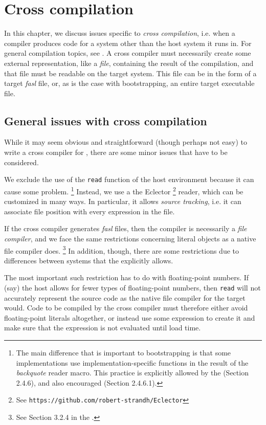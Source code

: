 \chapter{Cross compilation}
\label{chap-cross-compilation}

In this chapter, we discuss issues specific to \emph{cross
  compilation}, i.e. when a compiler produces code for a system other
than the host \commonlisp{} system it runs in.  For general
compilation topics, see .  A cross compiler
must necessarily create some external representation, like a
\emph{file}, containing the result of the compilation, and that file
must be readable on the target system.  This file can be in the form
of a target \emph{fasl} file, or, as is the case with \sysname{}
bootstrapping, an entire target executable file.

\section{General issues with cross compilation}

While it may seem obvious and straightforward (though perhaps not
easy) to write a cross compiler for \commonlisp{}, there are some minor issues
that have to be considered. 

We exclude the use of the \texttt{read} function of the host
environment because it can cause some problem.%
\footnote{The main difference that is important to bootstrapping is
  that some implementations use implementation-specific functions in
  the result of the \emph{backquote} reader macro.  This practice is
  explicitly allowed by the \hs{} (Section 2.4.6), and also encouraged
  (Section 2.4.6.1).}
Instead, we use a the Eclector%
\footnote{See \texttt{https://github.com/robert-strandh/Eclector}}
reader, which can be customized in many ways.  In particular, it
allows \emph{source tracking}, i.e. it can associate file position
with every expression in the file.

If the cross compiler generates \emph{fasl} files, then the compiler
is necessarily a \emph{file compiler}, and we face the same
restrictions concerning literal objects as a native file compiler
does.%
\footnote{See Section 3.2.4 in the \hs{}.} %
In addition, though, there are some restrictions due to differences
between systems that the \hs{} explicitly allows.  

The most important such restriction has to do with floating-point
numbers.  If (say) the host allows for fewer types of floating-point
numbers, then \texttt{read} will not accurately represent the source
code as the native file compiler for the target would.  Code to be
compiled by the cross compiler must therefore either avoid
floating-point literals altogether, or instead use some expression to
create it and make sure that the expression is not evaluated until
load time.  

